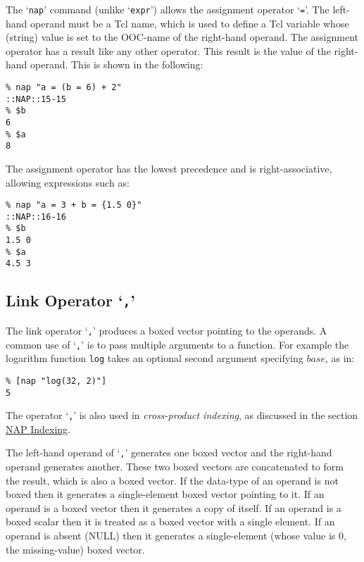   \par The `\texttt{nap}' command (unlike `\texttt{expr}') allows the assignment operator `\texttt{=}'. The left-hand operand must be a Tcl name, which
  is used to define a Tcl variable whose (string) value is set to the
  OOC-name of the right-hand operand. The assignment operator has a
  result like any other operator. This result is the value of the
  right-hand operand. This is shown in the following:
  \begin{verbatim}
% nap "a = (b = 6) + 2"
::NAP::15-15
% $b
6
% $a
8
\end{verbatim}

  \par The assignment operator has the lowest precedence and is
  right-associative, allowing expressions such as:
  \begin{verbatim}
% nap "a = 3 + b = {1.5 0}"
::NAP::16-16
% $b
1.5 0
% $a
4.5 3
\end{verbatim}

  \subsection{
    \label{Link}Link Operator `\texttt{,}'
  }

  \par The link operator `\texttt{,}' produces a boxed vector pointing to the
  operands. A common use of `\texttt{,}' is to pass multiple arguments to a function. For
  example the logarithm function 
  \texttt{log} takes an optional second argument specifying 
  $base$, as in:
  \begin{verbatim}
% [nap "log(32, 2)"]
5
\end{verbatim}

  \par The operator `\texttt{,}' is also used in 
  \textit{cross-product indexing}, as discussed in the section 
  \href{indexing.html}{NAP Indexing}.
  \par The left-hand operand of `\texttt{,}' generates one boxed vector and the right-hand
  operand generates another. These two boxed vectors are concatenated
  to form the result, which is also a boxed vector. If the data-type of
  an operand is not boxed then it generates a single-element boxed
  vector pointing to it. If an operand is a boxed vector then it
  generates a copy of itself. If an operand is a boxed scalar then it
  is treated as a boxed vector with a single element. If an operand is
  absent (NULL) then it generates a single-element (whose value is 0,
  the missing-value) boxed vector.
